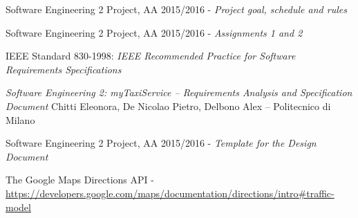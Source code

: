 \begin{thebibliography}{1}
    	Software Engineering 2 Project, AA 2015/2016 - \emph{Project goal, schedule and rules}

    	Software Engineering 2 Project, AA 2015/2016 - \emph{Assignments 1 and 2}

    	IEEE Standard 830-1998: \emph{IEEE Recommended Practice for Software Requirements Specifications}
	
        \emph{Software Engineering 2: myTaxiService –
        Requirements Analysis and Specification Document}
        Chitti Eleonora, De Nicolao Pietro, Delbono Alex – Politecnico di Milano

        Software Engineering 2 Project, AA 2015/2016 - \emph{Template for the Design Document}
        
    The Google Maps Directions API - \url{https://developers.google.com/maps/documentation/directions/intro#traffic-model}
\end{thebibliography}
